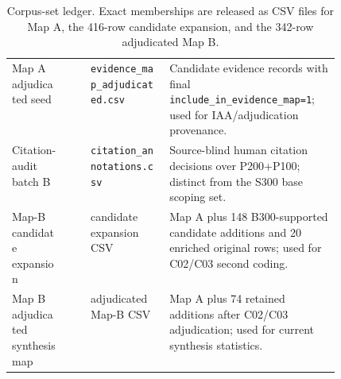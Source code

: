 \documentclass[11pt]{article}
\begin{document}
\begin{table}[t]
\begin{tabularx}{\linewidth}{>{\raggedright\arraybackslash}p{0.17\linewidth}>{\raggedleft\arraybackslash}p{0.07\linewidth}>{\raggedright\arraybackslash}p{0.24\linewidth}X}
Map A adjudicated seed & 268 & \texttt{evidence\_map\_adjudicated.csv} & Candidate evidence records with final \texttt{include\_in\_evidence\_map=1}; used for IAA/adjudication provenance. \\
Citation-audit batch B & 300 & \texttt{citation\_annotations.csv} & Source-blind human citation decisions over P200+P100; distinct from the S300 base scoping set. \\
Map-B candidate expansion & 416 & candidate expansion CSV & Map A plus 148 B300-supported candidate additions and 20 enriched original rows; used for C02/C03 second coding. \\
Map B adjudicated synthesis map & 342 & adjudicated Map-B CSV & Map A plus 74 retained additions after C02/C03 adjudication; used for current synthesis statistics. \\
\bottomrule
\end{tabularx}
\caption{Corpus-set ledger. Exact memberships are released as CSV files for Map A, the 416-row candidate expansion, and the 342-row adjudicated Map B.}
\label{tab:set-selection-ledger}
\end{table}

\end{document}

